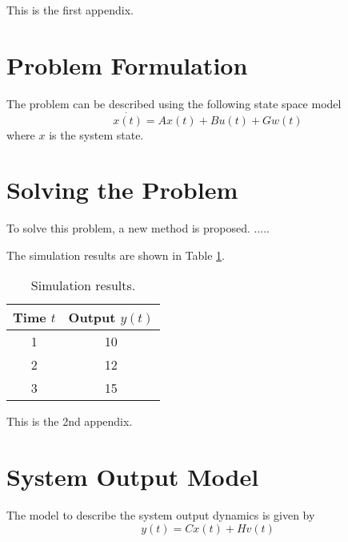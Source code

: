 \label{app:A}

This is the first appendix. 

\section{Problem Formulation}

The problem can be described using the following state space model
\begin{equation}
\dot{x(t)} = Ax(t) + Bu(t) + Gw(t)
\label{eqn:statespacemodel}
\end{equation}
where $x$ is the system state. 

\section{Solving the Problem}
To solve this problem, a new method is proposed. .....

The simulation results are shown in Table \ref{tab:sim}. 

\begin{table}
 \begin{center}
  \caption{Simulation results.}
  \label{tab:sim}
  \begin{tabular}{cc}
   \hline
    Time $t$ & Output $y(t)$\\
   \hline
    1 & 10 \\
    2 & 12\\
    3 & 15\\
   \hline
  \end{tabular}
 \end{center}
\end{table}


\label{app:B}

This is the 2nd appendix. 

\section{System Output Model}

The model to describe the system output dynamics is given by
\begin{equation}
 y(t) = Cx(t) + Hv(t)
\label{eqn:output}
\end{equation}


